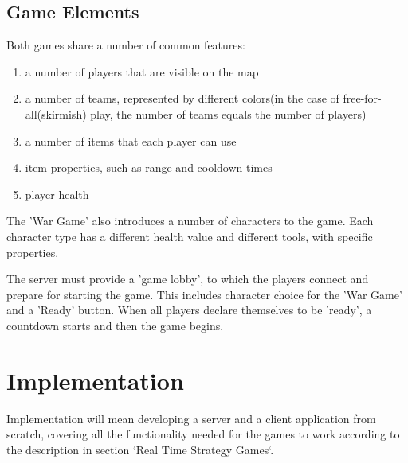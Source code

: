 \documentclass{article}
\begin{document}
\subsection{Game Elements}

Both games share a number of common features:
\begin{enumerate}
  \item a number of players that are visible on the map
  \item a number of teams, represented by different colors(in the case of
  free-for-all(skirmish) play, the number of teams equals the number of players)  
  \item a number of items that each player can use
  \item item properties, such as range and cooldown times
  \item player health
\end{enumerate} 

The 'War Game' also introduces a number of characters to the game. Each
character type has a different health value and different tools, with specific
properties.\newline

The server must provide a 'game lobby', to which the players connect and prepare
for starting the game. This includes character choice for the 'War Game' and a
'Ready' button. When all players declare themselves to be 'ready', a countdown
starts and then the game begins.\newline

\section{Implementation}

Implementation will mean developing a server and a client application from
scratch, covering all the functionality needed for the games to work according
to the description in section `Real Time Strategy Games`.
\end{document}

